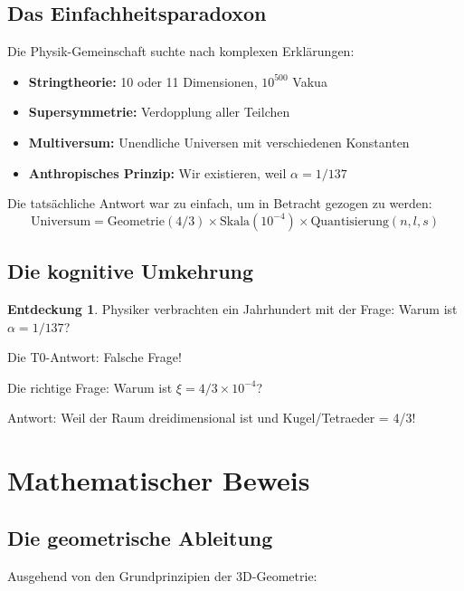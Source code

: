 \documentclass[12pt,a4paper]{article}
\theoremstyle{definition}
\newtheorem{entdeckung}{Entdeckung}[section]
\begin{document}
	\subsection{Das Einfachheitsparadoxon}
	
	Die Physik-Gemeinschaft suchte nach komplexen Erklärungen:
	
	\begin{itemize}
		\item \textbf{Stringtheorie:} 10 oder 11 Dimensionen, $10^{500}$ Vakua
		\item \textbf{Supersymmetrie:} Verdopplung aller Teilchen
		\item \textbf{Multiversum:} Unendliche Universen mit verschiedenen Konstanten
		\item \textbf{Anthropisches Prinzip:} Wir existieren, weil $\alpha = 1/137$
	\end{itemize}
	
	Die tatsächliche Antwort war zu einfach, um in Betracht gezogen zu werden:
	\begin{equation}
		\boxed{\text{Universum} = \text{Geometrie}(4/3) \times \text{Skala}(10^{-4}) \times \text{Quantisierung}(n,l,s)}
	\end{equation}
	
	\subsection{Die kognitive Umkehrung}
	
	\begin{entdeckung}
		Physiker verbrachten ein Jahrhundert mit der Frage: Warum ist $\alpha = 1/137$?
		
		Die T0-Antwort: Falsche Frage!
		
		Die richtige Frage: Warum ist $\xi = 4/3 \times 10^{-4}$?
		
		Antwort: Weil der Raum dreidimensional ist und Kugel/Tetraeder = 4/3!
	\end{entdeckung}
	
	\section{Mathematischer Beweis}
	
	\subsection{Die geometrische Ableitung}
	
	Ausgehend von den Grundprinzipien der 3D-Geometrie:
	
\end{document}
